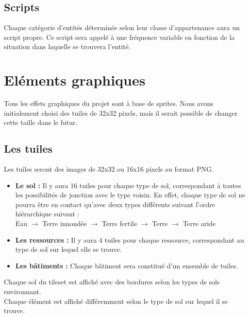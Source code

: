 \documentclass[a4paper]{memoir}
\begin{document}
			\subsection{Scripts}
				Chaque catégorie d'entités déterminée selon leur classe d'appartenance aura un script propre. Ce script sera appelé à une fréquence variable en fonction de la situation dans laquelle se trouvera l'entité.
			
		\section{Eléments graphiques}
			Tous les effets graphiques du projet sont à base de sprites. Nous avons initialement choisi des tuiles de 32x32 pixels, mais il serait possible de changer cette taille dans le futur.\\

			\subsection{Les tuiles}
				\label{Tuile}
				Les tuiles seront des images de 32x32 ou 16x16 pixels au format PNG.\\
				\begin{itemize}[label=$\bullet$]
					\item \textbf{Le sol :} Il y aura 16 tuiles pour chaque type de sol, correspondant à toutes les possibilités de jonction avec le type voisin. En effet, chaque type de sol ne pourra être en contact qu'avec deux types différents suivant l'ordre hiérarchique suivant :\\
					Eau $\rightarrow$ Terre innondée $\rightarrow$ Terre fertile $\rightarrow$ Terre $\rightarrow$ Terre aride
					\item \textbf{Les ressources :} Il y aura 4 tuiles pour chaque ressource, correspondant au type de sol sur lequel elle se trouve.
					\item \textbf{Les bâtiments :} Chaque bâtiment sera constitué d'un ensemble de tuiles.
				\end{itemize}
				Chaque sol du tileset est affiché avec des bordures selon les types de sols environnant.\\
				Chaque élément est affiché différemment selon le type de sol sur lequel il se trouve.\\
	
\end{document}
